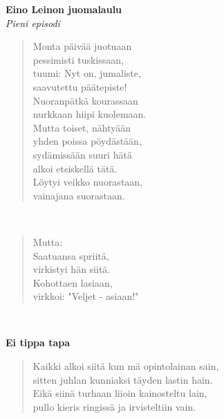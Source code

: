 %
%
\noindent\begin{minipage}{\linewidth}
\vspace{5pt}
\parbox[t]{0.85\linewidth}{\raggedright {\large\bf Eino Leinon juomalaulu}\\[2pt]\small\emph{Pieni episodi}\\[6pt]}
\begin{verse}
	
	Monta päivää juotuaan\\
	pessimisti tuskissaan,\\
	tuumi: Nyt on, jumaliste,\\
	saavutettu päätepiste!\\
	Nuoranpätkä kourassaan\\
	nurkkaan hiipi kuolemaan.\\
	Mutta toiset, nähtyään\\
	yhden poissa pöydästään,\\
	sydämissään suuri hätä\\
	alkoi etsiskellä tätä.\\
	Löytyi veikko nuorastaan,\\
	vainajana suorastaan.\\
\end{verse}
\end{minipage}\\[10pt]
\noindent\begin{minipage}{\linewidth}
\begin{verse}
	Mutta:\\
	Saatuansa spriitä,\\
	virkistyi hän siitä.\\
	Kohottaen lasiaan,\\
	virkkoi: "Veljet - asiaan!"\\
\end{verse}
\end{minipage}\\[10pt]
%
%
\noindent\begin{minipage}{\linewidth}
\vspace{5pt}
\parbox[t]{0.85\linewidth}{\raggedright {\large\bf Ei tippa tapa}\\[6pt]}
\begin{verse}
	Kaikki alkoi siitä kun mä opintolainan sain,\\
	sitten juhlan kunniaksi täyden lastin hain.\\
	Eikä siinä turhaan liioin kainosteltu lain,\\
	pullo kieris ringissä ja irvisteltiin vain.\\
\end{verse}
\end{minipage}\\[10pt]
